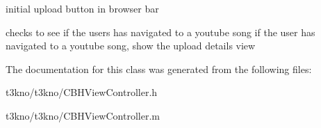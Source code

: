 initial upload button in browser bar 

checks to see if the users has navigated to a youtube song if the user has navigated to a youtube song, show the upload details view 

The documentation for this class was generated from the following files\-:\begin{DoxyCompactItemize}
\item 
t3kno/t3kno/C\-B\-H\-View\-Controller.\-h\item 
t3kno/t3kno/C\-B\-H\-View\-Controller.\-m\end{DoxyCompactItemize}
